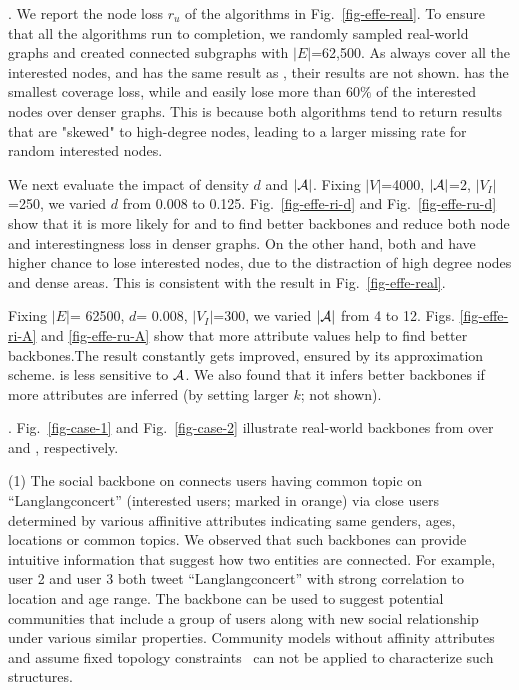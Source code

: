 \vspace{.5ex}
.
We report the node loss $r_u$ of the  algorithms
in Fig.~\ref{fig-effe-real}. To ensure that all the algorithms 
run to completion, we randomly sampled real-world graphs and created 
connected subgraphs with $|E|$=62,500. 
As \ks always cover
all the interested nodes, and
\naive has the same result as
\approxabd, their results are not shown. 
\approxabd has the smallest
coverage loss, while \cesna and \kcore
easily lose more than $60\%$ of the
interested nodes over denser graphs.
This is because both algorithms
tend to return results that are "skewed"
to high-degree nodes, leading to
a larger missing rate
for random interested nodes.

\vspace{.5ex}
We next evaluate the impact of density $d$ and
$|\A|$. Fixing $|V|$=4000, $|\A|$=2, $|V_I|$=250,
we varied $d$ from 0.008 to 0.125.
Fig.~\ref{fig-effe-ri-d} and Fig.~\ref{fig-effe-ru-d}
show that it is
more likely for \approxabd and \heuabd to find better
backbones and reduce both node and interestingness loss
in denser graphs.
On the other hand, both \cesna and \kcore
have higher chance to lose interested nodes,
due to the distraction of high degree nodes
and dense areas. This is consistent with
the result in Fig.~\ref{fig-effe-real}.

\vspace{.5ex}
Fixing $|E|$= 62500, $d$= 0.008, $|V_I|$=300,
we varied $|\A|$ from 4 to 12. Figs. \ref{fig-effe-ri-A} and  \ref{fig-effe-ru-A} show that more attribute values
help \approxabd to find better backbones.The result constantly gets improved, ensured
by its approximation scheme. \heuabd is less
sensitive to $\A$. We also found that
it infers better backbones if more attributes
are inferred (by setting larger $k$; not shown).

.
Fig.~\ref{fig-case-1} and Fig.~\ref{fig-case-2}
illustrate real-world backbones
from \approxabd over \weibo and
\cita, respectively.

\stab
(1) The social backbone on \weibo
connects users having common
topic on ``Langlangconcert''
(interested users; marked in orange)
via close users determined by
various affinitive
attributes indicating same genders, ages, locations
or common topics. We observed that such backbones can provide intuitive 
information that suggest how two entities are connected. For example, user 2 and user 3 both tweet ``Langlangconcert'' with strong correlation to location and 
age range. The backbone can be used to suggest 
potential communities that include a group of %
users along with new social relationship under various similar 
properties. %
Community models without affinity attributes and 
assume fixed topology constraints~\cite{zhang2017engagement} can not be applied to characterize 
such structures. 

